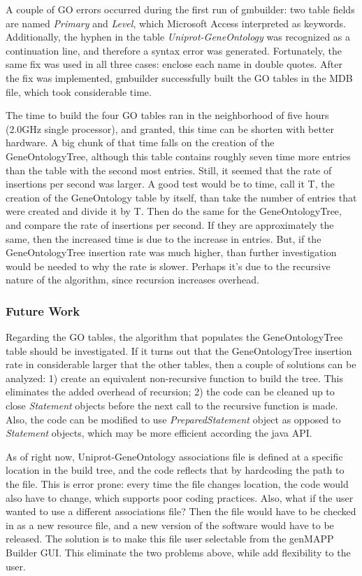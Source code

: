 A couple of GO errors occurred during the first run of gmbuilder: two table fields are named \emph{Primary} and \emph{Level}, which
Microsoft Access interpreted as keywords. Additionally, the hyphen in the table \emph{Uniprot-GeneOntology}
was recognized  as a continuation line, and therefore a syntax error was generated. Fortunately, the same fix was used
in all three cases: enclose each name in double quotes. After the fix was implemented, gmbuilder successfully built the
GO tables in the MDB file, which took considerable time.

The time to build the four GO tables ran in the neighborhood of five hours (2.0GHz single processor), and
granted, this time can be shorten with better hardware. A big chunk of that time falls on the creation of the
GeneOntologyTree, although this table contains roughly seven time more entries than the table with the second
most entries. Still, it seemed that the rate of insertions per second was larger.
A good test would be to time, call it T, the creation of the
GeneOntology table by itself, than take the number of entries that were created and divide it by T. Then do the same for the
GeneOntologyTree, and compare the rate of insertions per second. If they are approximately the same, then the increased time
is due to the increase in entries. But, if the GeneOntologyTree insertion rate was much higher, than further investigation would be
needed to why the rate is slower. Perhaps it's due to the recursive nature of the algorithm, since recursion increases overhead.


\subsubsection{Future Work}
Regarding the GO tables, the algorithm that populates the GeneOntologyTree table should be investigated.
If it turns out that the GeneOntologyTree insertion rate in considerable larger that the other tables, then
a couple of solutions can be analyzed: 1) create an equivalent non-recursive function to build the tree. This
eliminates the added overhead of recursion; 2) the code can be cleaned up to
close \emph{Statement} objects before the next call to the recursive function is made. Also, the code can
be modified to use \emph{PreparedStatement} object as opposed to \emph{Statement} objects, which may be more
efficient according the java API.


As of right now, Uniprot-GeneOntology associations file is defined at a specific location in the build tree,
and the code reflects that by hardcoding the path to the file. This is error prone: every time the file changes location,
the code would also have to change, which supports poor coding practices. Also, what if the user wanted to use a different
associations file? Then the file would have to be checked in as a new resource file, and a new version of the software would have
to be released. The solution is to make this file user selectable from the genMAPP Builder GUI. This eliminate the two problems
above, while add flexibility to the user.
